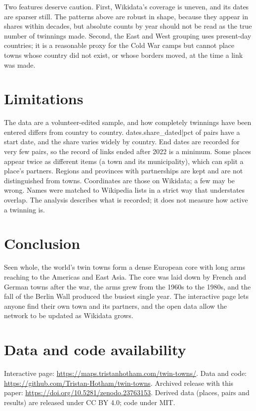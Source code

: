 \documentclass[11pt,a4paper]{article}
\begin{document}
Two features deserve caution. First, Wikidata's coverage is uneven, and its dates are sparser still. The patterns above are robust in shape, because they appear in shares within decades, but absolute counts by year should not be read as the true number of twinnings made. Second, the East and West grouping uses present-day countries; it is a reasonable proxy for the Cold War camps but cannot place towns whose country did not exist, or whose borders moved, at the time a link was made.

\section{Limitations}\label{sec:limits}

The data are a volunteer-edited sample, and how completely twinnings have been entered differs from country to country. {{dates.share_dated|pct}} of pairs have a start date, and the share varies widely by country. End dates are recorded for very few pairs, so the record of links ended after 2022 is a minimum. Some places appear twice as different items (a town and its municipality), which can split a place's partners. Regions and provinces with partnerships are kept and are not distinguished from towns. Coordinates are those on Wikidata; a few may be wrong. Names were matched to Wikipedia lists in a strict way that understates overlap. The analysis describes what is recorded; it does not measure how active a twinning is.

\section{Conclusion}

Seen whole, the world's twin towns form a dense European core with long arms reaching to the Americas and East Asia. The core was laid down by French and German towns after the war, the arms grew from the 1960s to the 1980s, and the fall of the Berlin Wall produced the busiest single year. The interactive page lets anyone find their own town and its partners, and the open data allow the network to be updated as Wikidata grows.

\section*{Data and code availability}

Interactive page: \url{https://maps.tristanhotham.com/twin-towns/}. Data and code: \url{https://github.com/Tristan-Hotham/twin-towns}. Archived release with this paper: \url{https://doi.org/10.5281/zenodo.23763153}. Derived data (places, pairs and results) are released under CC BY 4.0; code under MIT.
\end{document}
